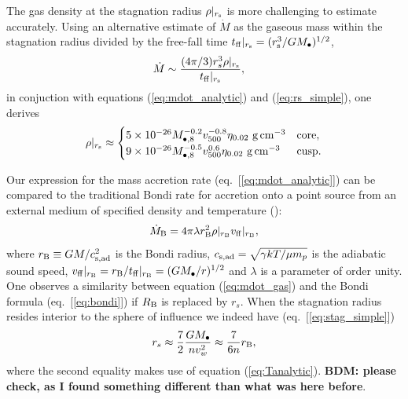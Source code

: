 \documentclass[usenatbib,fleqn]{mn2e}
\newcommand{\rs}{r_s}
\newcommand{\Mbh}[1][]{M_{\bullet#1}}
\newcommand{\Mbheight}{M_{\bullet,8}}
\newcommand{\vwO}{v_{w}}
\newcommand{\tff}{t_{\rm ff}}
\begin{document}
The gas density at the stagnation radius $\rho|_{r_{\rm s}}$ is more challenging to estimate accurately.  Using an alternative estimate of $\dot{M}$ as the gaseous mass within the stagnation radius divided by the free-fall time $t_{\rm ff}|_{r_{\rm s}} = (r_{\rm s}^{3}/GM_{\bullet})^{1/2}$,
\begin{align}
  &\dot{M}\sim\frac{(4 \pi/3) \rs^3 \rho|_{r_{\rm s}}}{\tff|_{r_{\rm s}}},
  \label{eq:mdot_gas}
\end{align}
 in conjuction with equations (\ref{eq:mdot_analytic}) and (\ref{eq:rs_simple}), one derives
\begin{align}
  \rho|_{r_{\rm s}}\approx
  \begin{cases}
    5 \times 10^{-26} \Mbheight^{-0.2} v_{500}^{-0.8}  \eta_{0.02} \,
    \, {\rm g \, cm^{-3}}& \text{core},\\
    9 \times 10^{-26}  \Mbheight^{-0.5} v_{500}^{0.6}  \eta_{0.02} \,\, {\rm g \,cm^{-3}} & \text{cusp}.
  \end{cases}
  \label{eq:rhors}
\end{align}


Our expression for the mass accretion rate (eq.~[\ref{eq:mdot_analytic}]) can be compared to the traditional Bondi rate for accretion onto a point source from an external medium of specified density and temperature (\citealt{Bondi52}):
\begin{align}
  \dot{M}_{\rm B} =4\pi \lambda r_{\rm B}^2 \rho|_{r_{\rm B}}v_{\rm ff}|_{r_{\rm B}},
\label{eq:bondi}
\end{align}
where $r_{\rm B} \equiv GM/c_{\rm s,ad}^{2}$ is the Bondi radius, $c_{\rm s,ad} = \sqrt{\gamma kT/\mu m_p}$ is the adiabatic sound speed, $v_{\rm ff}|_{r_{\rm B}} = r_{\rm B}/t_{\rm ff}|_{r_{\rm B}} = (GM_{\bullet}/r)^{1/2}$ and $\lambda$ is a parameter of order unity.  One observes a similarity between equation (\ref{eq:mdot_gas}) and the Bondi formula (eq.~[\ref{eq:bondi}]) if $R_{\rm B}$ is replaced by $\rs$.  When the stagnation radius resides interior to the sphere of influence we indeed have (eq.~[\ref{eq:stag_simple}])
\begin{align}
  \rs\approx\frac{7}{2}\frac{G \Mbh}{n \vwO^2} \approx \frac{7}{6n}r_{\rm B},
  \label{eq:rs_simple}
\end{align}
where the second equality makes use of equation (\ref{eq:Tanalytic}).  {\bf BDM: please check, as I found something different than what was here before}.   
\end{document}
